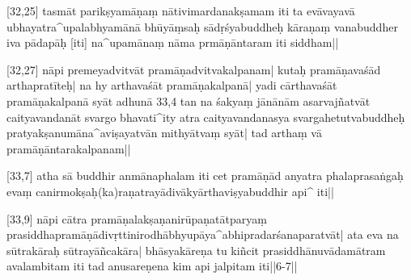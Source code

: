[32,25] tasmāt parikṣyamāṇaṃ nātivimardanakṣamam iti ta evāvayavā ubhayatra^upalabhyamānā bhūyāṃsaḥ sādṛśyabuddheḥ kāraṇaṃ vanabuddher iva 
pādapāḥ [iti] na^upamānaṃ nāma prmāṇāntaram iti siddham||

[32,27] nāpi premeyadvitvāt pramāṇadvitvakalpanam| kutaḥ pramāṇavaśād arthapratīteḥ| na hy arthavaśāt pramāṇakalpanā| yadi cārthavaśāt 
pramāṇakalpanā syāt adhunā 33,4       tan na śakyaṃ jānānām asarvajñatvāt caityavandanāt svargo bhavati^ity atra caityavandanasya svargahetutvabuddheḥ pratyakṣanumāna^aviṣayatvān mithyātvaṃ syāt| tad arthaṃ vā pramāṇāntarakalpanam||

[33,7] atha sā buddhir anmānaphalam iti cet pramāṇād anyatra 
phalaprasaṅgaḥ evaṃ canirmokṣaḥ(ka)raṇatrayādivākyārthaviṣyabuddhir api^ iti||

[33,9] nāpi cātra pramāṇalakṣaṇanirūpaṇatātparyaṃ 
prasiddhapramāṇādivṛttinirodhābhyupāya^abhipradarśanaparatvāt| ata eva na sūtrakāraḥ sūtrayāñcakāra| bhāsyakāreṇa tu kiñcit 
prasiddhānuvādamātram avalambitam iti tad anusareṇena kim api jalpitam iti||6-7||

